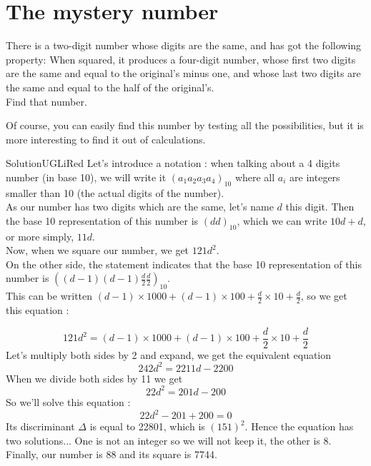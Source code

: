 \documentclass[12pt,a4paper,article,english,firamath]{nsi}
\begin{document}
\maketitle


\section*{The mystery number}
There is a two-digit number whose digits are the same, and has got the following property: When squared, it produces a four-digit number, whose first two digits are the same and equal to the original's minus one, and whose last two digits are the same and equal to the half of the original's.\\
Find that number.

\begin{remarque}[]
    Of course, you can easily find this number by testing all the possibilities, but it is more interesting to find it out of calculations.
\end{remarque}

\begin{encadrecolore}{Solution}{UGLiRed}
    Let's introduce a notation : when talking about a 4 digits number (in base 10), we will write it $(a_1a_2a_3a_4)_{10}$ where all $a_i$ are integers smaller than 10 (the actual digits of the number).\\


    As our number has two digits which are the same, let's name $d$ this digit. Then the base 10 representation of this number is $(dd)_{10}$, which we can write $10d+d$, or more simply, $11d$.\\
    Now, when we square our number, we get $121d^2$.\\
    On the other side, the statement indicates that the base 10 representation of this number is $((d-1)(d-1)\frac{d}{2}\frac{d}{2})_{10}$.\\
    This can be written $(d-1)\times1000+(d-1)\times100+\frac{d}{2}\times10 + \frac{d}{2}$, so we get this equation :

    $$121d^2 =(d-1)\times 1000+(d-1)\times 100+\frac{d}{2}\times 10 + \frac{d}{2}$$
    Let's multiply both sides by 2 and expand, we get the equivalent equation
    $$242d^2 = 2211d - 2200$$
    When we divide both sides by 11 we get
    $$22d^2= 201d-200$$
    So we'll solve this equation :
    $$22d^2-201+200=0$$
    Its discriminant $\Delta$ is equal to 22801, which is $(151)^2$. Hence the equation has two solutions... One is not an integer so we will not keep it, the other is 8.\\

    Finally, our number is 88 and its square is 7744.

\end{encadrecolore}
\end{document}

